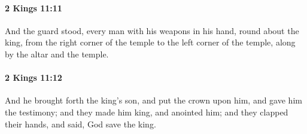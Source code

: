 		\paragraph{2 Kings 11:11} %
			\label{2KINGS-11-11}

			And the guard stood, every man with his weapons in his hand, round about the king, from the right corner of the temple to the left corner of the temple, along by the altar and the temple.


		\paragraph{2 Kings 11:12} %
			\label{2KINGS-11-12}

			And he brought forth the king’s son, and put the crown upon him, and gave him the testimony; and they made him king, and anointed him; and they clapped their hands, and said, God save the king.

